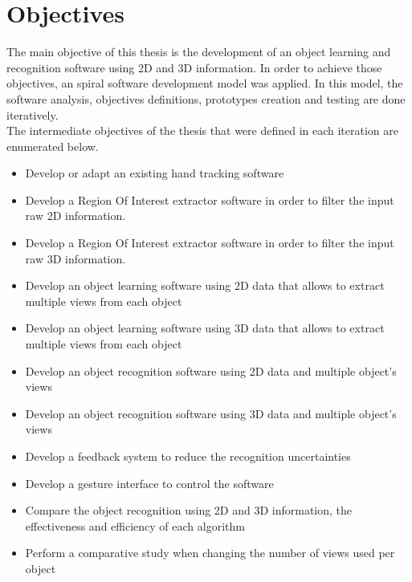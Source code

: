 \section{Objectives}

The main objective of this thesis is the development of an object learning and recognition software using 2D and 3D information. 
In order to achieve those objectives, an spiral software development model was applied. In this model, the software analysis, objectives definitions, prototypes creation and testing are done iteratively. 
\\

The intermediate objectives of the thesis that were defined in each iteration are enumerated below. 

\begin{itemize}

	\item{Develop or adapt an existing hand tracking software}
	\item{Develop a Region Of Interest extractor software in order to filter the input raw 2D information. }
	\item{Develop a Region Of Interest extractor software in order to filter the input raw 3D information. }
	\item{Develop an object learning software using 2D data that allows to extract multiple views from each object}
	\item{Develop an object learning software using 3D data that allows to extract multiple views from each object}
	\item{Develop an object recognition software using 2D data and multiple object's views}
	\item{Develop an object recognition software using 3D data and multiple object's views}
	\item{Develop a feedback system to reduce the recognition uncertainties}
	\item{Develop a gesture interface to control the software}
	\item{Compare the object recognition using 2D and 3D information, the effectiveness and efficiency of each algorithm}
	\item{Perform a comparative study when changing the number of views used per object}

\end{itemize}
